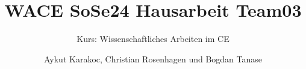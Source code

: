 \documentclass[
	ngerman,
	twoside,
	pdfa=false,
	ruledheaders=section,%
	class=report,%
	thesis={type=Hausarbeit},%
	accentcolor=2c,%
	custommargins=false,%
	marginpar=false,%
	parskip=half-,%
	fontsize=12pt,%
]{tudapub}
\begin{document}
	\title{WACE SoSe24 Hausarbeit Team03}
	\subtitle{Kurs: Wissenschaftliches Arbeiten im CE}
	\author[Karakoc, Rosenhagen, Tanase]{Aykut Karakoc, Christian Rosenhagen und Bogdan Tanase} %

	


	\maketitle


    
\end{document}
